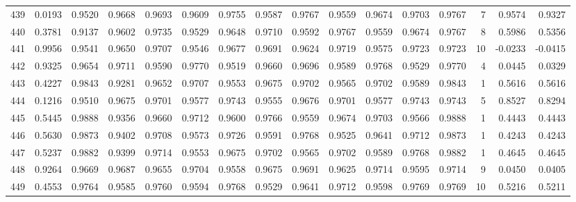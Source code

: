 \begin{tabular}{lrrrrrrrrrrrrrrr}
439 &      0.0193 &  0.9520 &  0.9668 &  0.9693 &  0.9609 &  0.9755 &  0.9587 &  0.9767 &  0.9559 &  0.9674 &   0.9703 &     0.9767 &      7 &                    0.9574 &                     0.9327 \\
440 &      0.3781 &  0.9137 &  0.9602 &  0.9735 &  0.9529 &  0.9648 &  0.9710 &  0.9592 &  0.9767 &  0.9559 &   0.9674 &     0.9767 &      8 &                    0.5986 &                     0.5356 \\
441 &      0.9956 &  0.9541 &  0.9650 &  0.9707 &  0.9546 &  0.9677 &  0.9691 &  0.9624 &  0.9719 &  0.9575 &   0.9723 &     0.9723 &     10 &                   -0.0233 &                    -0.0415 \\
442 &      0.9325 &  0.9654 &  0.9711 &  0.9590 &  0.9770 &  0.9519 &  0.9660 &  0.9696 &  0.9589 &  0.9768 &   0.9529 &     0.9770 &      4 &                    0.0445 &                     0.0329 \\
443 &      0.4227 &  0.9843 &  0.9281 &  0.9652 &  0.9707 &  0.9553 &  0.9675 &  0.9702 &  0.9565 &  0.9702 &   0.9589 &     0.9843 &      1 &                    0.5616 &                     0.5616 \\
444 &      0.1216 &  0.9510 &  0.9675 &  0.9701 &  0.9577 &  0.9743 &  0.9555 &  0.9676 &  0.9701 &  0.9577 &   0.9743 &     0.9743 &      5 &                    0.8527 &                     0.8294 \\
445 &      0.5445 &  0.9888 &  0.9356 &  0.9660 &  0.9712 &  0.9600 &  0.9766 &  0.9559 &  0.9674 &  0.9703 &   0.9566 &     0.9888 &      1 &                    0.4443 &                     0.4443 \\
446 &      0.5630 &  0.9873 &  0.9402 &  0.9708 &  0.9573 &  0.9726 &  0.9591 &  0.9768 &  0.9525 &  0.9641 &   0.9712 &     0.9873 &      1 &                    0.4243 &                     0.4243 \\
447 &      0.5237 &  0.9882 &  0.9399 &  0.9714 &  0.9553 &  0.9675 &  0.9702 &  0.9565 &  0.9702 &  0.9589 &   0.9768 &     0.9882 &      1 &                    0.4645 &                     0.4645 \\
448 &      0.9264 &  0.9669 &  0.9687 &  0.9655 &  0.9704 &  0.9558 &  0.9675 &  0.9691 &  0.9625 &  0.9714 &   0.9595 &     0.9714 &      9 &                    0.0450 &                     0.0405 \\
449 &      0.4553 &  0.9764 &  0.9585 &  0.9760 &  0.9594 &  0.9768 &  0.9529 &  0.9641 &  0.9712 &  0.9598 &   0.9769 &     0.9769 &     10 &                    0.5216 &                     0.5211 \\

\end{tabular}
